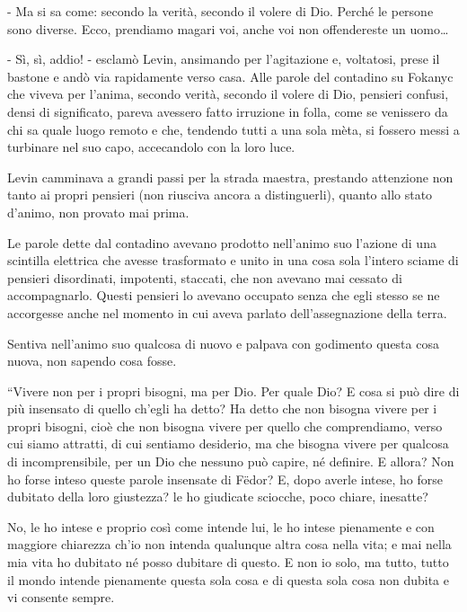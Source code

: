 - Ma si sa come: secondo la verità, secondo il volere di Dio. Perché le persone sono diverse. Ecco, prendiamo magari voi, anche voi non offendereste un uomo\ldots{} 

- Sì, sì, addio! - esclamò Levin, ansimando per l'agitazione e, voltatosi, prese il bastone e andò via rapidamente verso casa. Alle parole del contadino su Fokanyc che viveva per l'anima, secondo verità, secondo il volere di Dio, pensieri confusi, densi di significato, pareva avessero fatto irruzione in folla, come se venissero da chi sa quale luogo remoto e che, tendendo tutti a una sola mèta, si fossero messi a turbinare nel suo capo, accecandolo con la loro luce. 

Levin camminava a grandi passi per la strada maestra, prestando attenzione non tanto ai propri pensieri (non riusciva ancora a distinguerli), quanto allo stato d'animo, non provato mai prima. 

Le parole dette dal contadino avevano prodotto nell'animo suo l'azione di una scintilla elettrica che avesse trasformato e unito in una cosa sola l'intero sciame di pensieri disordinati, impotenti, staccati, che non avevano mai cessato di accompagnarlo. Questi pensieri lo avevano occupato senza che egli stesso se ne accorgesse anche nel momento in cui aveva parlato dell'assegnazione della terra. 

Sentiva nell'animo suo qualcosa di nuovo e palpava con godimento questa cosa nuova, non sapendo cosa fosse. 

``Vivere non per i propri bisogni, ma per Dio. Per quale Dio? E cosa si può dire di più insensato di quello ch'egli ha detto? Ha detto che non bisogna vivere per i propri bisogni, cioè che non bisogna vivere per quello che comprendiamo, verso cui siamo attratti, di cui sentiamo desiderio, ma che bisogna vivere per qualcosa di incomprensibile, per un Dio che nessuno può capire, né definire. E allora? Non ho forse inteso queste parole insensate di Fëdor? E, dopo averle intese, ho forse dubitato della loro giustezza? le ho giudicate sciocche, poco chiare, inesatte? 

No, le ho intese e proprio così come intende lui, le ho intese pienamente e con maggiore chiarezza ch'io non intenda qualunque altra cosa nella vita; e mai nella mia vita ho dubitato né posso dubitare di questo. E non io solo, ma tutto, tutto il mondo intende pienamente questa sola cosa e di questa sola cosa non dubita e vi consente sempre. 

